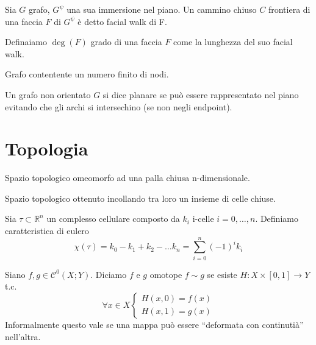 \begin{definizione}
    Sia \(G\) grafo, \(G^\psi\) una sua immersione nel piano. Un cammino chiuso \(C\) frontiera di una faccia \(F\) di \(G^\psi\) è detto facial walk di F.
\end{definizione}

\begin{definizione}
    Definaiamo \(\deg(F)\) grado di una faccia \(F\) come la lunghezza del suo facial walk.
\end{definizione}
\begin{definizione}
    Grafo contentente un numero finito di nodi.
\end{definizione}
\begin{definizione}
    Un grafo non orientato \(G\) si dice planare se può essere rappresentato nel piano evitando che gli archi si intersechino (se non negli endpoint).
\end{definizione}
\chapter{Topologia}
\begin{definizione}
    Spazio topologico omeomorfo ad una palla chiusa n-dimensionale.
\end{definizione}
\begin{definizione}
    Spazio topologico ottenuto incollando tra loro un insieme di celle chiuse.
\end{definizione}
\begin{definizione}\label{caratteristica-eulero}
    Sia \(\tau \subset \mathbb{R}^n\) un complesso cellulare composto da \(k_i\) i-celle \(i=0,\dots,n\). Definiamo caratteristica di eulero
    \begin{equation}
        \chi(\tau) = k_0 - k_1 + k_2 - \dots k_n = \sum_{i=0}^{n}{(-1)}^i k_i
    \end{equation}
\end{definizione}

\begin{definizione}
    Siano \(f,g \in \mathcal{C}^0(X;Y)\). Diciamo \(f\) e \(g\) omotope \(f \sim g\) se esiste \(H : X \times [0,1] \to Y\) t.c.
    \begin{equation}
        \forall x \in X \begin{cases}
            H(x,0)=f(x) \\
            H(x,1)=g(x)
        \end{cases}
    \end{equation}
    Informalmente questo vale se una mappa può essere “deformata con continutià” nell'altra.
\end{definizione}

